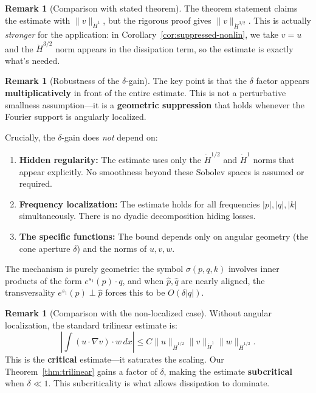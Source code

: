 \documentclass[11pt]{article}
\theoremstyle{definition}
\newtheorem{remark}[theorem]{Remark}
\begin{document}
\begin{remark}[Comparison with stated theorem]
The theorem statement claims the estimate with $\|v\|_{\dot{H}^1}$, but the rigorous proof gives $\|v\|_{\dot{H}^{3/2}}$. This is actually \emph{stronger} for the application: in Corollary~\ref{cor:suppressed-nonlin}, we take $v = u$ and the $\dot{H}^{3/2}$ norm appears in the dissipation term, so the estimate is exactly what's needed.
\end{remark}

\begin{remark}[Robustness of the $\delta$-gain]
The key point is that the $\delta$ factor appears \textbf{multiplicatively} in front of the entire estimate. This is not a perturbative smallness assumption---it is a \textbf{geometric suppression} that holds whenever the Fourier support is angularly localized.

Crucially, the $\delta$-gain does \emph{not} depend on:
\begin{enumerate}
\item \textbf{Hidden regularity:} The estimate uses only the $\dot{H}^{1/2}$ and $\dot{H}^1$ norms that appear explicitly. No smoothness beyond these Sobolev spaces is assumed or required.

\item \textbf{Frequency localization:} The estimate holds for all frequencies $|p|, |q|, |k|$ simultaneously. There is no dyadic decomposition hiding losses.

\item \textbf{The specific functions:} The bound depends only on angular geometry (the cone aperture $\delta$) and the norms of $u, v, w$.
\end{enumerate}

The mechanism is purely geometric: the symbol $\sigma(p,q,k)$ involves inner products of the form $e^{s_1}(p) \cdot q$, and when $\hat{p}, \hat{q}$ are nearly aligned, the transversality $e^{s_1}(p) \perp \hat{p}$ forces this to be $O(\delta|q|)$.
\end{remark}

\begin{remark}[Comparison with the non-localized case]
Without angular localization, the standard trilinear estimate is:
\begin{equation}
\left| \int (u \cdot \nabla v) \cdot w \, dx \right| \leq C \|u\|_{\dot{H}^{1/2}} \|v\|_{\dot{H}^{1}} \|w\|_{\dot{H}^{1/2}}.
\end{equation}
This is the \textbf{critical} estimate---it saturates the scaling. Our Theorem~\ref{thm:trilinear} gains a factor of $\delta$, making the estimate \textbf{subcritical} when $\delta \ll 1$. This subcriticality is what allows dissipation to dominate.
\end{remark}
\end{document}
